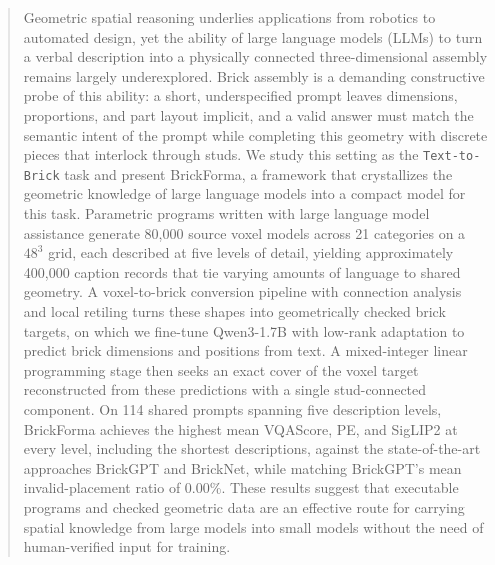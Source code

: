 \begin{abstract}
Geometric spatial reasoning underlies applications from robotics to automated design, yet the ability of large language models (LLMs) to turn a verbal description into a physically connected three-dimensional assembly remains largely underexplored. Brick assembly is a demanding constructive probe of this ability: a short, underspecified prompt leaves dimensions, proportions, and part layout implicit, and a valid answer must match the semantic intent of the prompt while completing this geometry with discrete pieces that interlock through studs. We study this setting as the \texttt{Text-to-Brick} task and present BrickForma, a framework that crystallizes the geometric knowledge of large language models into a compact model for this task. Parametric programs written with large language model assistance generate 80,000 source voxel models across 21 categories on a $48^3$ grid, each described at five levels of detail, yielding approximately 400,000 caption records that tie varying amounts of language to shared geometry. A voxel-to-brick conversion pipeline with connection analysis and local retiling turns these shapes into geometrically checked brick targets, on which we fine-tune Qwen3-1.7B with low-rank adaptation to predict brick dimensions and positions from text. A mixed-integer linear programming stage then seeks an exact cover of the voxel target reconstructed from these predictions with a single stud-connected component. On 114 shared prompts spanning five description levels, BrickForma achieves the highest mean VQAScore, PE, and SigLIP2 at every level, including the shortest descriptions, against the state-of-the-art approaches BrickGPT and BrickNet, while matching BrickGPT's mean invalid-placement ratio of 0.00\%. These results suggest that executable programs and checked geometric data are an effective route for carrying spatial knowledge from large models into small models without the need of human-verified input for training.
\end{abstract}